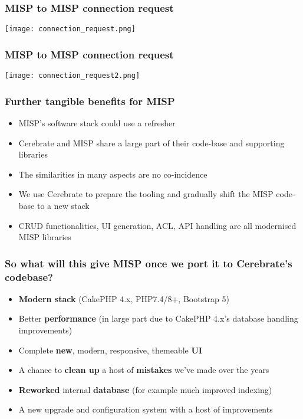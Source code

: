 \begin{frame}
\frametitle{MISP to MISP connection request}
\texttt{[image: connection\_request.png]}
\end{frame}

\begin{frame}
\frametitle{MISP to MISP connection request}
    \begin{center}
        \texttt{[image: connection\_request2.png]}
    \end{center}
\end{frame}

\begin{frame}
	\frametitle{Further tangible benefits for MISP}
	\begin{itemize}
            \item MISP's software stack could use a refresher
            \item Cerebrate and MISP share a large part of their code-base and supporting libraries
            \item The similarities in many aspects are no co-incidence
            \item We use Cerebrate to prepare the tooling and gradually shift the MISP code-base to a new stack
            \item CRUD functionalities, UI generation, ACL, API handling are all modernised MISP libraries
	\end{itemize}
\end{frame}

\begin{frame}
	\frametitle{So what will this give MISP once we port it to Cerebrate's codebase?}
	\begin{itemize}
            \item {\bf Modern stack} (CakePHP 4.x, PHP7.4/8+, Bootstrap 5)
            \item Better {\bf performance} (in large part due to CakePHP 4.x's database handling improvements)
            \item Complete {\bf new}, modern, responsive, themeable {\bf UI}
            \item A chance to {\bf clean up} a host of {\bf mistakes} we've made over the years
            \item {\bf Reworked} internal {\bf database} (for example much improved indexing)
            \item A new upgrade and configuration system with a host of improvements
	\end{itemize}
\end{frame}

